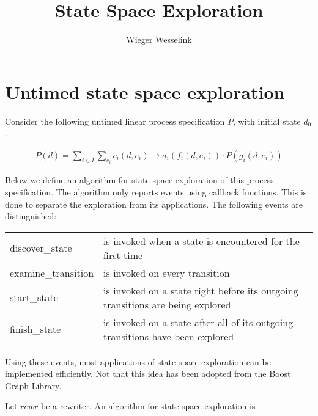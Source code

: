 \documentclass{article}
\title{State Space Exploration}
\author{Wieger Wesselink}
\begin{document}
\maketitle

\section{Untimed state space exploration}
Consider the following untimed linear process specification $P$, with initial state $d_0$. 

\[
\begin{array}{l}
P(d)=
\sum\limits_{i\in I}\sum\limits_{e_i}c_i(d, e_i)\rightarrow a_i(f_i(d,e_i)) \cdot P(g_i(d,e_i))
\end{array}
\]

Below we define an algorithm for state space exploration of this process specification. The algorithm only
reports events using callback functions. This is done to separate the exploration from its applications.
The following events are distinguished:

\begin{center}
\begin{tabular}{ |l|l| } 
\hline
\textsf{discover\_state} & is invoked when a state is encountered for the first time \\ 
\textsf{examine\_transition} & is invoked on every transition \\ 
\textsf{start\_state} & is invoked on a state right before its outgoing transitions are being explored \\ 
\textsf{finish\_state} & is invoked on a state after all of its outgoing transitions have been explored \\ 
\hline
\end{tabular}
\end{center}

Using these events, most applications of state space exploration can be implemented efficiently.
Not that this idea has been adopted from the Boost Graph Library. 

Let $rewr$ be a rewriter. An algorithm for state space exploration is 
\end{document}
